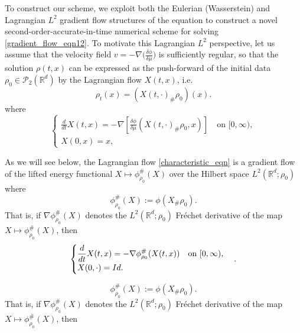 \documentclass[10pt,a4paper]{amsart}
\newcommand{\PP}{\mathcal{P}}
\newcommand{\R}{{\mathbb R}}
\begin{document}
To construct our scheme, we exploit both the Eulerian (Wasserstein) and Lagrangian $L^2$ gradient flow structures of the equation to construct a novel second-order-accurate-in-time numerical scheme for solving \eqref{gradient_flow_eqn12}. To motivate this Lagrangian $L^2$ perspective, let us assume that the velocity field $v=-\nabla \bigl( \frac{\delta \phi}{\delta \mu} \bigr)$ is sufficiently regular, so that the solution $\rho(t,x)$ can be expressed as the push-forward of the initial data $\rho_0\in \PP_2(\R^d)$ by the Lagrangian flow $X(t,x)$, i.e.
\begin{equation}
\rho_t(x) = (X(t,\cdot)_{\#} \rho_0)(x). \label{pushforward_rho_def}
\end{equation}
where
\begin{equation}
\begin{cases} 
\displaystyle \frac{d}{dt}X(t,x)  =-\nabla \left[ \frac{\delta \phi}{\delta \mu}( X(t,\cdot)_{\#} \rho_0,x) \right] \quad \text{on } [0,\infty),  \\
X(0,x) = x, \label{characteristic_eqn}
\end{cases}
\end{equation}

As we will see below, the Lagrangian flow \eqref{characteristic_eqn} is a gradient flow of the lifted energy functional $X\mapsto \phi^{\#}_{\rho_0}(X)$ over the Hilbert space $L^2(\R^d;\rho_0)$ where
\begin{equation} \phi^{\#}_{\rho_0}(X) := \phi(X_{\#} \rho_0). \label{lift_intro_def} \end{equation} That is, if $\nabla \phi^{\#}_{\rho_0}(X)$ denotes the $L^2(\R^d;\rho_0)$ Fréchet derivative of the map $X \mapsto \phi^{\#}_{\rho_0}(X)$, then
\begin{equation}
\begin{cases} 
\displaystyle \frac{d}{dt}X(t,x) = -\nabla \phi^{\#}_{\rho_0}(X(t,x)) \quad \text{on } [0,\infty),  \\
X(0,\cdot) = \textnormal{Id}. \label{L2_Lagrangian_Flow}
\end{cases}.
\end{equation}

\begin{equation} \phi^{\#}_{\rho_0}(X) := \phi(X_{\#} \rho_0).  \end{equation} That is, if $\nabla \phi^{\#}_{\rho_0}(X)$ denotes the $L^2(\R^d;\rho_0)$ Fréchet derivative of the map $X \mapsto \phi^{\#}_{\rho_0}(X)$, then
\end{document}

